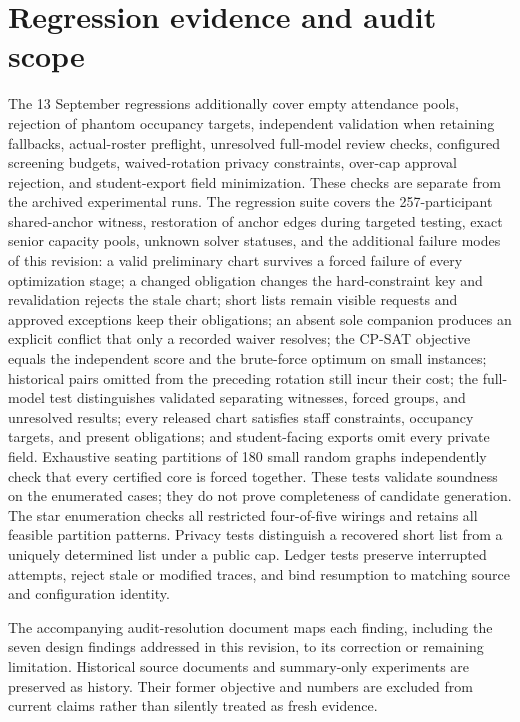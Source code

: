 \documentclass[11pt,a4paper]{article}
\theoremstyle{definition}\newtheorem{definition}[theorem]{Definition}
\theoremstyle{remark}\newtheorem{remark}[theorem]{Remark}
\begin{document}
\section{Regression evidence and audit scope}
The 13 September regressions additionally cover empty attendance pools, rejection of phantom occupancy targets, independent validation when retaining fallbacks, actual-roster preflight, unresolved full-model review checks, configured screening budgets, waived-rotation privacy constraints, over-cap approval rejection, and student-export field minimization. These checks are separate from the archived experimental runs. The regression suite covers the 257-participant shared-anchor witness, restoration of anchor edges during targeted testing, exact senior capacity pools, unknown solver statuses, and the additional failure modes of this revision: a valid preliminary chart survives a forced failure of every optimization stage; a changed obligation changes the hard-constraint key and revalidation rejects the stale chart; short lists remain visible requests and approved exceptions keep their obligations; an absent sole companion produces an explicit conflict that only a recorded waiver resolves; the CP-SAT objective equals the independent score and the brute-force optimum on small instances; historical pairs omitted from the preceding rotation still incur their cost; the full-model test distinguishes validated separating witnesses, forced groups, and unresolved results; every released chart satisfies staff constraints, occupancy targets, and present obligations; and student-facing exports omit every private field. Exhaustive seating partitions of 180 small random graphs independently check that every certified core is forced together. These tests validate soundness on the enumerated cases; they do not prove completeness of candidate generation. The star enumeration checks all restricted four-of-five wirings and retains all feasible partition patterns. Privacy tests distinguish a recovered short list from a uniquely determined list under a public cap. Ledger tests preserve interrupted attempts, reject stale or modified traces, and bind resumption to matching source and configuration identity.

The accompanying audit-resolution document maps each finding, including the seven design findings addressed in this revision, to its correction or remaining limitation. Historical source documents and summary-only experiments are preserved as history. Their former objective and numbers are excluded from current claims rather than silently treated as fresh evidence.
\end{document}
